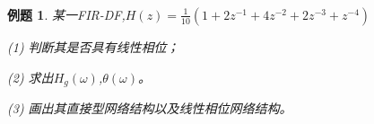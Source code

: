 \documentclass[notheorems,compress,mathserif,table]{beamer}
\newtheorem{example}{例题}
\begin{document}
\begin{frame}\frametitle{}%
\begin{example}
     某一FIR-DF,$H(z)=\frac{1}{10}(1+2z^{-1}+4z^{-2}+2z^{-3}+z^{-4})$
     \par(1) 判断其是否具有线性相位；
     \par(2) 求出$H_g(\omega)$,$\theta(\omega)$。
     \par(3) 画出其直接型网络结构以及线性相位网络结构。
\end{example}
\end{frame}


\end{document}
